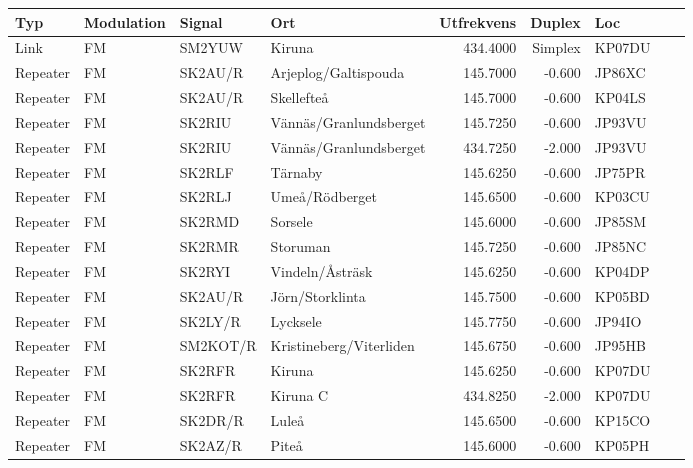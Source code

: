 \begin{longtable}{llllrrlcl}
	Typ      & Modulation   & Signal    & Ort                     & Utfrekvens &  Duplex & Loc    &  &  \\ \hline
	Link     & FM           & SM2YUW    & Kiruna                  &   434.4000 & Simplex & KP07DU &  &  \\
	Repeater & FM           & SK2AU/R   & Arjeplog/Galtispouda    &   145.7000 &  -0.600 & JP86XC &  &  \\
	Repeater & FM           & SK2AU/R   & Skellefteå              &   145.7000 &  -0.600 & KP04LS &  &  \\
	Repeater & FM           & SK2RIU    & Vännäs/Granlundsberget  &   145.7250 &  -0.600 & JP93VU &  &  \\
	Repeater & FM           & SK2RIU    & Vännäs/Granlundsberget  &   434.7250 &  -2.000 & JP93VU &  &  \\
	Repeater & FM           & SK2RLF    & Tärnaby                 &   145.6250 &  -0.600 & JP75PR &  &  \\
	Repeater & FM           & SK2RLJ    & Umeå/Rödberget          &   145.6500 &  -0.600 & KP03CU &  &  \\
	Repeater & FM           & SK2RMD    & Sorsele                 &   145.6000 &  -0.600 & JP85SM &  &  \\
	Repeater & FM           & SK2RMR    & Storuman                &   145.7250 &  -0.600 & JP85NC &  &  \\
	Repeater & FM           & SK2RYI    & Vindeln/Åsträsk         &   145.6250 &  -0.600 & KP04DP &  &  \\
	Repeater & FM           & SK2AU/R   & Jörn/Storklinta         &   145.7500 &  -0.600 & KP05BD &  &  \\
	Repeater & FM           & SK2LY/R   & Lycksele                &   145.7750 &  -0.600 & JP94IO &  &  \\
	Repeater & FM           & SM2KOT/R  & Kristineberg/Viterliden &   145.6750 &  -0.600 & JP95HB &  &  \\
	Repeater & FM           & SK2RFR    & Kiruna                  &   145.6250 &  -0.600 & KP07DU &  &  \\
	Repeater & FM           & SK2RFR    & Kiruna C                &   434.8250 &  -2.000 & KP07DU &  &  \\
	Repeater & FM           & SK2DR/R   & Luleå                   &   145.6500 &  -0.600 & KP15CO &  &  \\
	Repeater & FM           & SK2AZ/R   & Piteå                   &   145.6000 &  -0.600 & KP05PH &  &  \\

\end{longtable}
